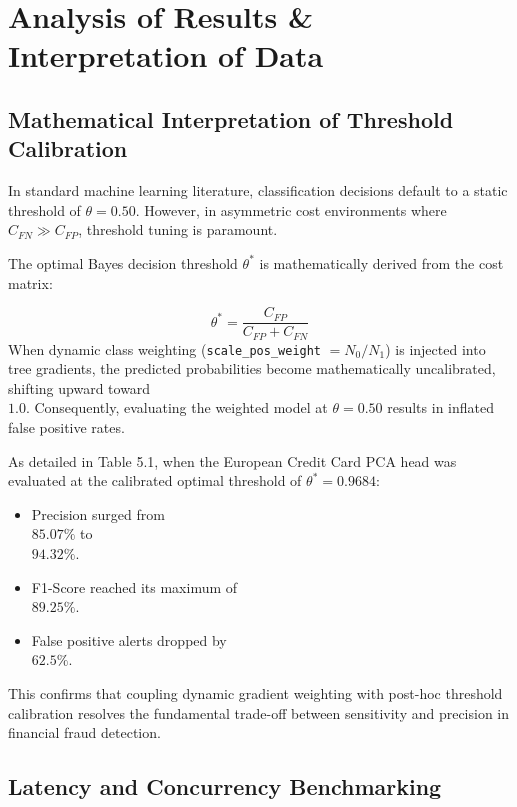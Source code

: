 \documentclass[12pt,a4paper,oneside]{report}
\begin{document}
\section{Analysis of Results \& Interpretation of Data}

\subsection{Mathematical Interpretation of Threshold Calibration}

In standard machine learning literature, classification decisions default to a static threshold of $\theta = 0.50$. However, in asymmetric cost environments where $C_{FN} \gg C_{FP}$, threshold tuning is paramount.


The optimal Bayes decision threshold $\theta^*$ is mathematically derived from the cost matrix:

\begin{equation}
\theta^* = \frac{C_{FP}}{C_{FP} + C_{FN}}
\end{equation}
When dynamic class weighting (\texttt{scale\_pos\_weight} $= N_0 / N_1$) is injected into tree gradients, the predicted probabilities become mathematically uncalibrated, shifting upward toward \\$1.0$. Consequently, evaluating the weighted model at $\theta = 0.50$ results in inflated false positive rates.


As detailed in Table 5.1, when the European Credit Card PCA head was evaluated at the calibrated optimal threshold of $\theta^* = 0.9684$:

\begin{itemize}[leftmargin=0.35in]
\item Precision surged from \\$85.07\%$ to \\$94.32\%$.
\item F1-Score reached its maximum of \\$89.25\%$.
\item False positive alerts dropped by \\$62.5\%$.
\end{itemize}

This confirms that coupling dynamic gradient weighting with post-hoc threshold calibration resolves the fundamental trade-off between sensitivity and precision in financial fraud detection.



\subsection{Latency and Concurrency Benchmarking}
\end{document}
